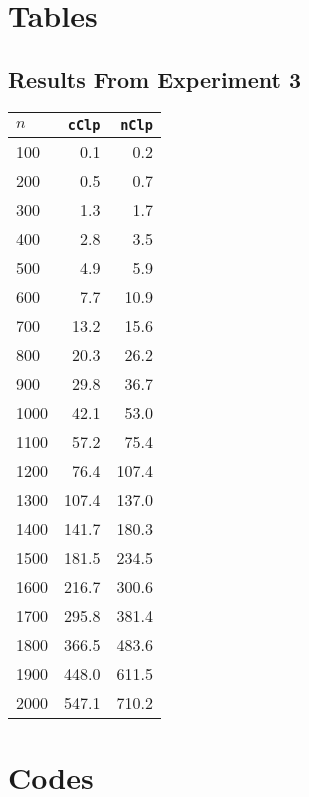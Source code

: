 \appendix

\chapter{Tables}
\section{Results From Experiment 3}
\label{app:exp1}
\begin{tabular}{lrr}
     $n$ & \texttt{cClp}      & \texttt{nClp} \\ \hline
     100 &   0.1              &   0.2 \\
     200 &   0.5              &   0.7 \\
     300 &   1.3              &   1.7 \\
     400 &   2.8              &   3.5 \\
     500 &   4.9              &   5.9 \\
     600 &   7.7              &  10.9 \\
     700 &  13.2              &  15.6 \\
     800 &  20.3              &  26.2 \\
     900 &  29.8              &  36.7 \\
    1000 &  42.1              &  53.0 \\
    1100 &  57.2              &  75.4 \\
    1200 &  76.4              & 107.4 \\
    1300 & 107.4              & 137.0 \\
    1400 & 141.7              & 180.3 \\
    1500 & 181.5              & 234.5 \\
    1600 & 216.7              & 300.6 \\
    1700 & 295.8              & 381.4 \\
    1800 & 366.5              & 483.6 \\
    1900 & 448.0              & 611.5 \\
    2000 & 547.1              & 710.2
\end{tabular}

\chapter{Codes}
